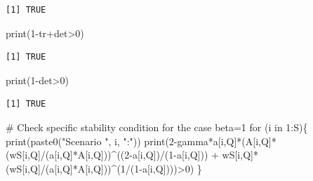 \documentclass[
  letterpaper,
  DIV=11,
  numbers=noendperiod]{scrreprt}
\newenvironment{Shaded}{\begin{snugshade}}{\end{snugshade}}
\newcommand{\CommentTok}[1]{\textcolor[rgb]{0.37,0.37,0.37}{#1}}
\newcommand{\ControlFlowTok}[1]{\textcolor[rgb]{0.00,0.23,0.31}{#1}}
\newcommand{\DecValTok}[1]{\textcolor[rgb]{0.68,0.00,0.00}{#1}}
\newcommand{\FunctionTok}[1]{\textcolor[rgb]{0.28,0.35,0.67}{#1}}
\newcommand{\NormalTok}[1]{\textcolor[rgb]{0.00,0.23,0.31}{#1}}
\newcommand{\SpecialCharTok}[1]{\textcolor[rgb]{0.37,0.37,0.37}{#1}}
\newcommand{\StringTok}[1]{\textcolor[rgb]{0.13,0.47,0.30}{#1}}
\begin{document}
\begin{verbatim}
[1] TRUE
\end{verbatim}

\begin{Shaded}
\begin{Highlighting}[]
\FunctionTok{print}\NormalTok{(}\DecValTok{1}\SpecialCharTok{{-}}\NormalTok{tr}\SpecialCharTok{+}\NormalTok{det}\SpecialCharTok{\textgreater{}}\DecValTok{0}\NormalTok{)}
\end{Highlighting}
\end{Shaded}

\begin{verbatim}
[1] TRUE
\end{verbatim}

\begin{Shaded}
\begin{Highlighting}[]
\FunctionTok{print}\NormalTok{(}\DecValTok{1}\SpecialCharTok{{-}}\NormalTok{det}\SpecialCharTok{\textgreater{}}\DecValTok{0}\NormalTok{)}
\end{Highlighting}
\end{Shaded}

\begin{verbatim}
[1] TRUE
\end{verbatim}

\begin{Shaded}
\begin{Highlighting}[]
\CommentTok{\# Check specific stability condition for the case beta=1}
\ControlFlowTok{for}\NormalTok{ (i }\ControlFlowTok{in} \DecValTok{1}\SpecialCharTok{:}\NormalTok{S)\{}
\FunctionTok{print}\NormalTok{(}\FunctionTok{paste0}\NormalTok{(}\StringTok{"Scenario "}\NormalTok{, i, }\StringTok{":"}\NormalTok{))}
\FunctionTok{print}\NormalTok{(}\DecValTok{2}\SpecialCharTok{{-}}\NormalTok{gamma}\SpecialCharTok{*}\NormalTok{a[i,Q]}\SpecialCharTok{*}\NormalTok{(A[i,Q]}\SpecialCharTok{*}\NormalTok{(wS[i,Q]}\SpecialCharTok{/}\NormalTok{(a[i,Q]}\SpecialCharTok{*}\NormalTok{A[i,Q]))}\SpecialCharTok{\^{}}\NormalTok{((}\DecValTok{2}\SpecialCharTok{{-}}\NormalTok{a[i,Q])}\SpecialCharTok{/}\NormalTok{(}\DecValTok{1}\SpecialCharTok{{-}}\NormalTok{a[i,Q])) }
                      \SpecialCharTok{+}\NormalTok{ wS[i,Q]}\SpecialCharTok{*}\NormalTok{(wS[i,Q]}\SpecialCharTok{/}\NormalTok{(a[i,Q]}\SpecialCharTok{*}\NormalTok{A[i,Q]))}\SpecialCharTok{\^{}}\NormalTok{(}\DecValTok{1}\SpecialCharTok{/}\NormalTok{(}\DecValTok{1}\SpecialCharTok{{-}}\NormalTok{a[i,Q])))}\SpecialCharTok{\textgreater{}}\DecValTok{0}\NormalTok{)}
\NormalTok{\}}
\end{Highlighting}
\end{Shaded}
\end{document}
